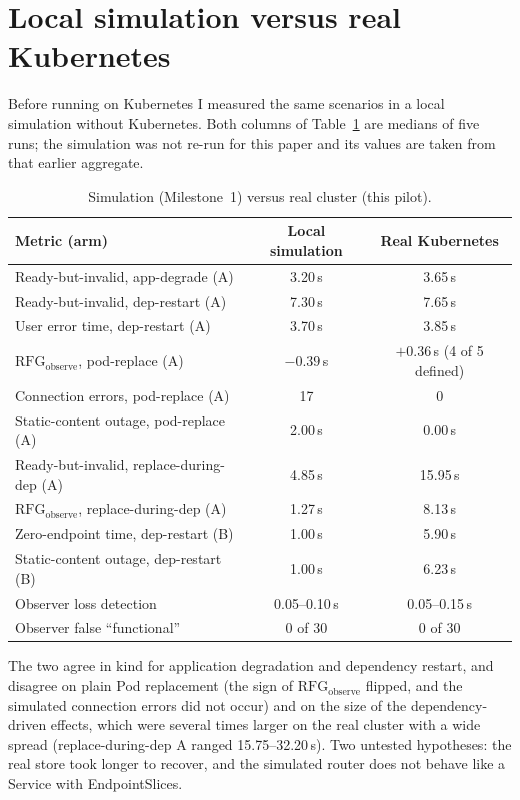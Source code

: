 \documentclass[11pt,a4paper]{article}
\begin{document}
\section{Local simulation versus real Kubernetes}
Before running on Kubernetes I measured the same scenarios in a local simulation without Kubernetes. Both columns of Table~\ref{tab:sim} are medians of five runs; the simulation was not re-run for this paper and its values are taken from that earlier aggregate.
\begin{table}[H]
\centering\small
\begin{tabular}{@{}lcc@{}}
\toprule
Metric (arm) & Local simulation & Real Kubernetes\\
\midrule
Ready-but-invalid, app-degrade (A) & 3.20\,s & 3.65\,s\\
Ready-but-invalid, dep-restart (A) & 7.30\,s & 7.65\,s\\
User error time, dep-restart (A) & 3.70\,s & 3.85\,s\\
$\mathrm{RFG}_{\mathrm{observe}}$, pod-replace (A) & $-0.39$\,s & $+0.36$\,s (4 of 5 defined)\\
Connection errors, pod-replace (A) & 17 & 0\\
Static-content outage, pod-replace (A) & 2.00\,s & 0.00\,s\\
Ready-but-invalid, replace-during-dep (A) & 4.85\,s & 15.95\,s\\
$\mathrm{RFG}_{\mathrm{observe}}$, replace-during-dep (A) & 1.27\,s & 8.13\,s\\
Zero-endpoint time, dep-restart (B) & 1.00\,s & 5.90\,s\\
Static-content outage, dep-restart (B) & 1.00\,s & 6.23\,s\\
Observer loss detection & 0.05--0.10\,s & 0.05--0.15\,s\\
Observer false ``functional'' & 0 of 30 & 0 of 30\\
\bottomrule
\end{tabular}
\caption{Simulation (Milestone~1) versus real cluster (this pilot).}
\label{tab:sim}
\end{table}
The two agree in kind for application degradation and dependency restart, and disagree on plain Pod replacement (the sign of $\mathrm{RFG}_{\mathrm{observe}}$ flipped, and the simulated connection errors did not occur) and on the size of the dependency-driven effects, which were several times larger on the real cluster with a wide spread (replace-during-dep A ranged 15.75--32.20\,s). Two untested hypotheses: the real store took longer to recover, and the simulated router does not behave like a Service with EndpointSlices.
\end{document}
